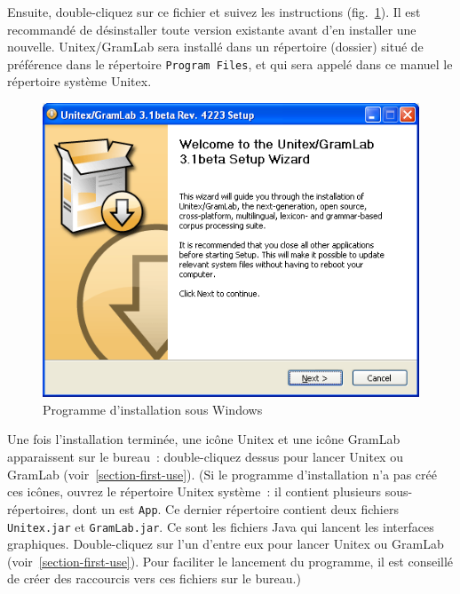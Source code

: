 \begin{flushleft}
{\tt \UnitexPackageWin{}}
{\tt \UnitexPackageWinSF{}}
\end{flushleft}

\noindent Ensuite, double-cliquez sur ce fichier et suivez les instructions (fig.~\ref{fig-installer}).
Il est recommandé de désinstaller
toute version existante avant d'en installer une nouvelle. Unitex/GramLab sera installé
dans un répertoire (dossier) situé
de préférence dans le répertoire  \verb+Program Files+, et qui sera appelé dans ce manuel
le répertoire système Unitex.

\begin{figure}[!ht]
\begin{center}
\includegraphics[width=13cm]{resources/img/installer.png}
\caption{Programme d'installation sous Windows\label{fig-installer}}
\end{center}
\end{figure}


\bigskip
\noindent Une fois l'installation terminée, une icône Unitex et une icône GramLab apparaissent
sur le bureau~: double-cliquez dessus pour lancer Unitex ou GramLab (voir~\ref{section-first-use}).
(Si le programme d'installation n'a pas créé ces icônes, ouvrez le répertoire Unitex système~: il contient
plusieurs sous-répertoires, dont un est \verb+App+.  Ce dernier répertoire contient deux fichiers
\verb+Unitex.jar+ et \verb+GramLab.jar+.
 Ce sont les fichiers Java qui lancent les interfaces graphiques. Double-cliquez sur l'un d'entre eux
pour lancer Unitex ou GramLab (voir~\ref{section-first-use}).
Pour faciliter le lancement du programme, il est conseillé de créer des raccourcis vers ces fichiers sur le bureau.)

